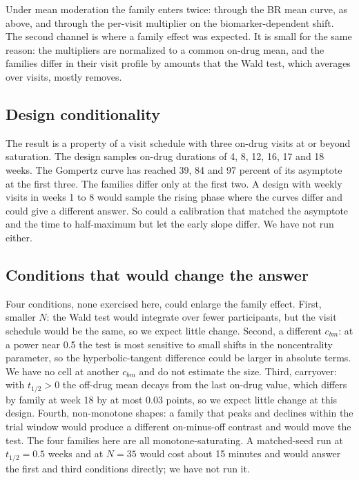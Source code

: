 \documentclass[
  11pt,
]{article}
\newcounter{none} %
\begin{document}
Under mean moderation the family enters twice: through the BR mean
curve, as above, and through the per-visit multiplier on the
biomarker-dependent shift. The second channel is where a family effect
was expected. It is small for the same reason: the multipliers are
normalized to a common on-drug mean, and the families differ in their
visit profile by amounts that the Wald test, which averages over
visits, mostly removes.

\subsection{Design conditionality}\label{design-conditionality}

The result is a property of a visit schedule with three on-drug visits
at or beyond saturation. The design samples on-drug durations of 4, 8,
12, 16, 17 and 18 weeks. The Gompertz curve has reached
39,
84 and
97 percent of
its asymptote at the first three. The families differ only at the
first two. A design with weekly visits in weeks 1 to 8 would sample the
rising phase where the curves differ and could give a different
answer. So could a calibration that matched the asymptote and the time
to half-maximum but let the early slope differ. We have not run either.

\subsection{Conditions that would change the answer}\label{conditions-that-would-change-the-answer}

Four conditions, none exercised here, could enlarge the family effect.
First, smaller \(N\): the Wald test would integrate over fewer
participants, but the visit schedule would be the same, so we expect
little change. Second, a different \(c_{bm}\): at a power near 0.5 the
test is most sensitive to small shifts in the noncentrality parameter,
so the hyperbolic-tangent difference could be larger in absolute terms.
We have no cell at another \(c_{bm}\) and do not estimate the size.
Third, carryover: with \(t_{1/2} > 0\) the off-drug mean decays from the
last on-drug value, which differs by family at week 18 by at most
0.03 points, so we expect
little change at this design. Fourth, non-monotone shapes: a family
that peaks and declines within the trial window would produce a
different on-minus-off contrast and would move the test. The four
families here are all monotone-saturating. A matched-seed run at
\(t_{1/2} = 0.5\) weeks and at \(N = 35\) would cost about 15 minutes and
would answer the first and third conditions directly; we have not run
it.
\end{document}
